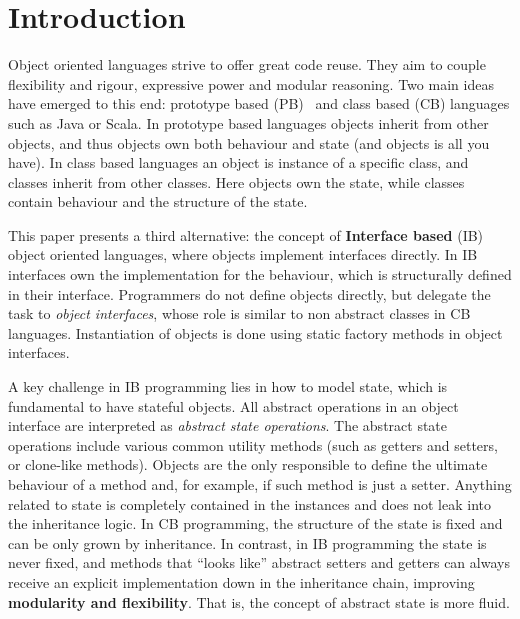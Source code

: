 \section{Introduction}\label{sec:intro}

Object oriented languages strive to offer great code reuse.
They aim to couple flexibility and rigour, expressive power and
modular reasoning.  Two main ideas have emerged to this end: prototype
based (PB)~\cite{Ungar87self} and class based (CB) languages such as
Java or Scala.  In prototype based
languages objects inherit from other objects, and thus objects own
both behaviour and state (and objects is all you have).
In class based languages an object is instance of a specific class,
and classes inherit from other classes.  Here objects own the state,
while classes contain behaviour and the structure of the state.

This paper presents a third alternative: the concept of
\textbf{Interface based} (IB) object oriented languages, where objects
implement interfaces directly. In IB interfaces own the implementation
for the behaviour, which is structurally defined in their
interface. Programmers do not define objects directly, but delegate
the task to \emph{object interfaces}, whose role is similar to non
abstract classes in CB languages. Instantiation of objects is
done using static factory methods in object interfaces.

A key challenge in IB programming lies in how to model state, which is
fundamental to have stateful objects. All abstract operations in an
object interface are interpreted as \emph{abstract state
  operations}. The abstract state operations include various common
utility methods (such as getters and setters, or clone-like
methods). Objects are the only responsible to define the ultimate
behaviour of a method and, for example, if such method is just a
setter. Anything related to state is completely contained in the
instances and does not leak into the inheritance logic.  In CB
programming, the structure of the state is fixed and can be only grown
by inheritance.  In contrast, in IB programming the state is never
fixed, and methods that ``looks like'' abstract setters and getters
can always receive an explicit implementation down in the inheritance
chain, improving \textbf{modularity and flexibility}.  That is, the
concept of abstract state is more fluid.

